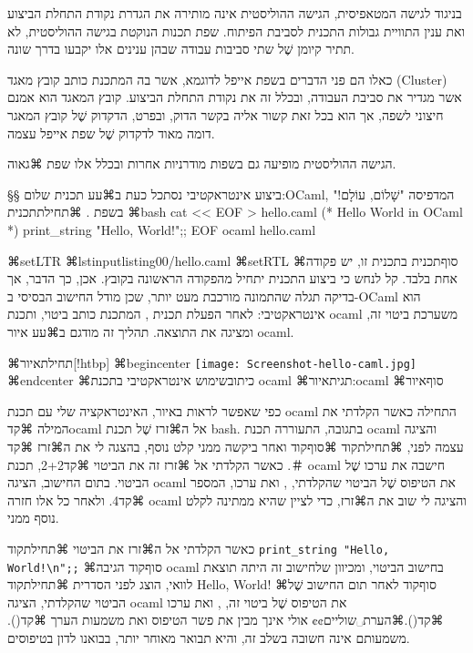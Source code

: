 בניגוד לגישה המטאפיסית, הגישה ההוליסטית אינה מותירה את הגדרת נקודת התחלת הביצוע
ואת ענין התוויית גבולות התכנית לסביבת הפיתוח. שפת תכנות הנוקטת בגישה ההוליסטית,
לא תתיר קיומן שֶׁל שתי סביבות עבודה שבהן ענינים אלו יקבעו בדרך שונה.

כאלו הם פני הדברים בשפת אייפל לדוגמא, אשר בה המתכנת כותב קובץ מאגד (Cluster)
אשר מגדיר את סביבת העבודה, ובכלל זה את נקודת התחלת הביצוע. קובץ המאגד הוא אמנם
חיצוני לשפה, אך הוא בכל זאת קשור אליה בקשר הדוק, ובפרט, הדקדוק שֶׁל קובץ המאגר
דומה מאוד לדקדוק שֶׁל שפת אייפל עצמה.

הגישה ההוליסטית מופיעה גם בשפות מודרניות אחרות ובכלל אלו שפת ⌘גאוה.

§§ ביצוע אינטראקטיבי
נסתכל כעת ב⌘עע תכנית שלום:OCaml, המדפיסה "שָׁלוֹם, עוֹלָם!" בשפת .
⌘תחילת{תכנית}
⌘bash
cat << EOF > hello.caml
(* Hello World in OCaml *)
print_string "Hello, World!\n";;
EOF
ocaml hello.caml
\END

⌘setLTR
\lstset{language=[Objective]Caml,style=Numbered}
⌘lstinputlisting{00/hello.caml}
⌘setRTL
⌘סוף{תכנית}
בתכנית זו, יש פקודה אחת בלבד.
קל לנחש כי ביצוע התכנית יתחיל מהפקודה הראשונה בקובץ.
אכן, כך הדבר, אך בדיקה תגלה שהתמונה מורכבת מעט יותר, שכן
מודל החישוב הבסיסי ב-OCaml הוא אינטראקטיבי:
לאחר הפעלת תכנית , המתכנת כותב ביטוי, ותכנת ocaml
משערכת ביטוי זה, ומציגה את התוצאה.
תהליך זה מודגם ב⌘עע איור ocaml.

⌘תחילת{איור}[!htbp]
⌘begin{center}
\texttt{[image: Screenshot-hello-caml.jpg]}
⌘end{center}
⌘כיתוב{שימוש אינטראקטיבי בתכנת ocaml}
⌘תגית{איור:ocaml}
⌘סוף{איור}

כפי שאפשר לראות באיור, האינטראקציה שלי עם תכנת ocaml התחילה כאשר הקלדתי
את המילה ⌘קד{ocaml} אל ה⌘זרז שֶׁל תכנת bash.
בתגובה, התעוררה תכנת ocaml והציגה עצמה לפני,
⌘תחילת{קוד}
⌘סוף{קוד}
ואחר ביקשה ממני קלט נוסף, בהצגה לי את ה⌘זרז ⌘קד{＃}.
 כאשר הקלדתי אל ⌘זרז זה את הביטוי ⌘קד{2+2},
 תכנת ocaml חישבה את ערכו שֶׁל הביטוי.
 בתום החישוב, הציגה ocaml את הטיפוס שֶׁל הביטוי שהקלדתי, ,
 ואת ערכו, המספר ⌘קד{4}. ולאחר כל אלו חזרה ocaml והציגה לי שוב את ה⌘זרז, כדי לציין שהיא ממתינה
 לקלט נוסף ממני.

 כאשר הקלדתי אל ה⌘זרז את הביטוי
 ⌘תחילת{קוד}
 \let\ttfamily=\listingsfont
 \verb+print_string "Hello, World!\n";;+
 ⌘סוף{קוד}
 הגיבה ocaml בחישוב הביטוי, ומכיוון שלחישוב זה היתה תוצאת לוואי, הוצג לפני
 הסדרית
 ⌘תחילת{קוד}
 \listingsfont
 Hello, World!
 ⌘סוף{קוד}
 לאחר תום החישוב שֶׁל הביטוי שהקלדתי, הציגה ocaml את הטיפוס שֶׁל ביטוי זה, , ואת ערכו
 ⌘קד{()}.⌘הערת␣שוליים{¢¢
   אולי אינך מבין את פשר הטיפוס  ואת משמעות הערך ⌘קד{()}. משמעותם
 אינה חשובה בשלב זה, והיא תבואר מאוחר יותר, בבואנו לדון בטיפוסים.}

